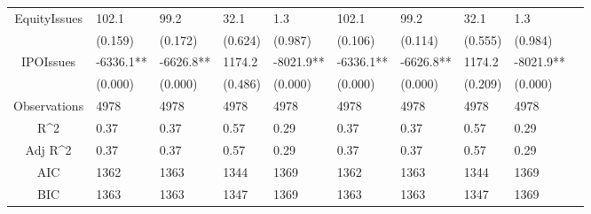 \documentclass{article}
\begin{document}
\begin{table}[H]
\begin{tabular}{|clllllllll|}
  EquityIssues & 102.1 & 99.2 & 32.1 & 1.3 & 102.1 & 99.2 & 32.1 & 1.3 & \\ 
   & (0.159) & (0.172) & (0.624) & (0.987) & (0.106) & (0.114) & (0.555) & (0.984) & \\ 
  IPOIssues & -6336.1** & -6626.8** & 1174.2 & -8021.9** & -6336.1** & -6626.8** & 1174.2 & -8021.9** & \\ 
   & (0.000) & (0.000) & (0.486) & (0.000) & (0.000) & (0.000) & (0.209) & (0.000) & \\ 
  \hline 
 Observations & 4978 & 4978 & 4978 & 4978 & 4978 & 4978 & 4978 & 4978 & \\ 
  R^2 & 0.37 & 0.37 & 0.57 & 0.29 & 0.37 & 0.37 & 0.57 & 0.29 & \\ 
  Adj R^2 & 0.37 & 0.37 & 0.57 & 0.29 & 0.37 & 0.37 & 0.57 & 0.29 & \\ 
  AIC & 1362 & 1363 & 1344 & 1369 & 1362 & 1363 & 1344 & 1369 & \\ 
  BIC & 1363 & 1363 & 1347 & 1369 & 1363 & 1363 & 1347 & 1369 & \\ 
   \hline
\end{tabular}
 
\end{table}
\end{document}
